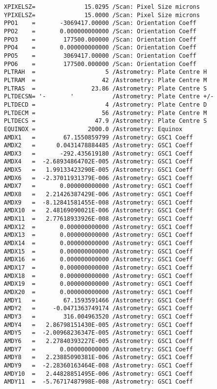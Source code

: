 \documentclass[11pt]{article}
\begin{document}
\begin{tcolorbox}[breakable, size=fbox, boxrule=.5pt, pad at break*=1mm, opacityfill=0]
\begin{Verbatim}[commandchars=\\\{\}]
XPIXELSZ=              15.0295 /Scan: Pixel Size microns
YPIXELSZ=              15.0000 /Scan: Pixel Size microns
PPO1    =       -3069417.00000 /Scan: Orientation Coeff
PPO2    =       0.000000000000 /Scan: Orientation Coeff
PPO3    =        177500.000000 /Scan: Orientation Coeff
PPO4    =       0.000000000000 /Scan: Orientation Coeff
PPO5    =        3069417.00000 /Scan: Orientation Coeff
PPO6    =        177500.000000 /Scan: Orientation Coeff
PLTRAH  =                    5 /Astrometry: Plate Centre H
PLTRAM  =                   42 /Astrometry: Plate Centre M
PLTRAS  =                23.86 /Astrometry: Plate Centre S
PLTDECSN= '-       '           /Astrometry: Plate Centre +/-
PLTDECD =                    4 /Astrometry: Plate Centre D
PLTDECM =                   56 /Astrometry: Plate Centre M
PLTDECS =                 47.9 /Astrometry: Plate Centre S
EQUINOX =               2000.0 /Astrometry: Equinox
AMDX1   =        67.1550859799 /Astrometry: GSC1 Coeff
AMDX2   =      0.0431478884485 /Astrometry: GSC1 Coeff
AMDX3   =       -292.435619180 /Astrometry: GSC1 Coeff
AMDX4   =  -2.68934864702E-005 /Astrometry: GSC1 Coeff
AMDX5   =   1.99133423290E-005 /Astrometry: GSC1 Coeff
AMDX6   =  -2.37011931379E-006 /Astrometry: GSC1 Coeff
AMDX7   =       0.000000000000 /Astrometry: GSC1 Coeff
AMDX8   =   2.21426387429E-006 /Astrometry: GSC1 Coeff
AMDX9   =  -8.12841581455E-008 /Astrometry: GSC1 Coeff
AMDX10  =   2.48169090021E-006 /Astrometry: GSC1 Coeff
AMDX11  =   2.77618933926E-008 /Astrometry: GSC1 Coeff
AMDX12  =       0.000000000000 /Astrometry: GSC1 Coeff
AMDX13  =       0.000000000000 /Astrometry: GSC1 Coeff
AMDX14  =       0.000000000000 /Astrometry: GSC1 Coeff
AMDX15  =       0.000000000000 /Astrometry: GSC1 Coeff
AMDX16  =       0.000000000000 /Astrometry: GSC1 Coeff
AMDX17  =       0.000000000000 /Astrometry: GSC1 Coeff
AMDX18  =       0.000000000000 /Astrometry: GSC1 Coeff
AMDX19  =       0.000000000000 /Astrometry: GSC1 Coeff
AMDX20  =       0.000000000000 /Astrometry: GSC1 Coeff
AMDY1   =        67.1593591466 /Astrometry: GSC1 Coeff
AMDY2   =     -0.0471363749174 /Astrometry: GSC1 Coeff
AMDY3   =        316.004963520 /Astrometry: GSC1 Coeff
AMDY4   =   2.86798151430E-005 /Astrometry: GSC1 Coeff
AMDY5   =  -2.00968236347E-005 /Astrometry: GSC1 Coeff
AMDY6   =   2.27840393227E-005 /Astrometry: GSC1 Coeff
AMDY7   =       0.000000000000 /Astrometry: GSC1 Coeff
AMDY8   =   2.23885090381E-006 /Astrometry: GSC1 Coeff
AMDY9   =  -2.28360163464E-008 /Astrometry: GSC1 Coeff
AMDY10  =   2.44828851495E-006 /Astrometry: GSC1 Coeff
AMDY11  =  -5.76717487998E-008 /Astrometry: GSC1 Coeff

\end{Verbatim}
\end{tcolorbox}
\end{document}
